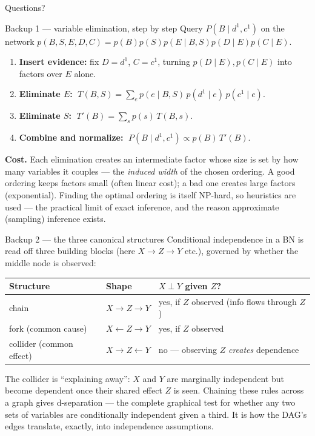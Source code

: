 \documentclass[10pt, aspectratio=169]{beamer}
\begin{document}
\begin{frame}[standout]
Questions?
\end{frame}

\appendix

\begin{frame}{Backup 1 --- variable elimination, step by step}
\footnotesize
Query $P(B\mid d^1,c^1)$ on the network $p(B,S,E,D,C)=p(B)p(S)p(E\mid B,S)p(D\mid E)p(C\mid E)$.
\medskip
\begin{enumerate}\setlength\itemsep{1pt}
\item \textbf{Insert evidence:} fix $D=d^1$, $C=c^1$, turning $p(D\mid E),p(C\mid E)$ into factors over $E$ alone.
\item \textbf{Eliminate $E$:} $\;T(B,S) = \sum_e p(e\mid B,S)\,p(d^1\mid e)\,p(c^1\mid e)$.
\item \textbf{Eliminate $S$:} $\;T'(B) = \sum_s p(s)\,T(B,s)$.
\item \textbf{Combine and normalize:} $\;P(B\mid d^1,c^1) \propto p(B)\,T'(B)$.
\end{enumerate}
\medskip
\textbf{Cost.} Each elimination creates an intermediate factor whose size is set by how many variables it couples --- the \emph{induced width} of the chosen ordering. A good ordering keeps factors small (often linear cost); a bad one creates large factors (exponential). Finding the optimal ordering is itself NP-hard, so heuristics are used --- the practical limit of exact inference, and the reason approximate (sampling) inference exists.
\end{frame}

\begin{frame}{Backup 2 --- the three canonical structures}
\footnotesize
Conditional independence in a BN is read off three building blocks (here $X \to Z \to Y$ etc.), governed by whether the middle node is observed:
\medskip
\begin{center}\scriptsize\renewcommand{\arraystretch}{1.35}
\begin{tabular}{l|l|l}
\textbf{Structure} & \textbf{Shape} & \textbf{$X \perp Y$ given $Z$?} \\
\hline
chain & $X \to Z \to Y$ & yes, if $Z$ observed (info flows through $Z$) \\
fork (common cause) & $X \leftarrow Z \to Y$ & yes, if $Z$ observed \\
collider (common effect) & $X \to Z \leftarrow Y$ & \alert{no} --- observing $Z$ \emph{creates} dependence \\
\end{tabular}
\end{center}
\medskip
The collider is ``explaining away'': $X$ and $Y$ are marginally independent but become dependent once their shared effect $Z$ is seen. Chaining these rules across a graph gives \alert{d-separation} --- the complete graphical test for whether any two sets of variables are conditionally independent given a third. It is how the DAG's edges translate, exactly, into independence assumptions.
\end{frame}
\end{document}
